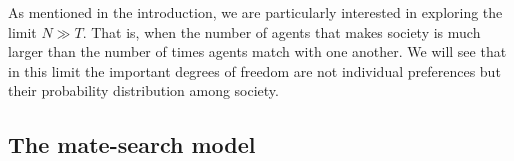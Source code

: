 \documentclass[12pt]{article}
\begin{document}

As mentioned in the introduction, we are particularly interested in exploring the limit $N\gg T$. That is, when the number of agents that makes society is much larger than the number of times agents match with one another. We will see that in this limit the important degrees of freedom are not individual preferences but their probability distribution among society. %


\subsection{The mate-search model}
\label{dynamicalmatching}
\end{document}
